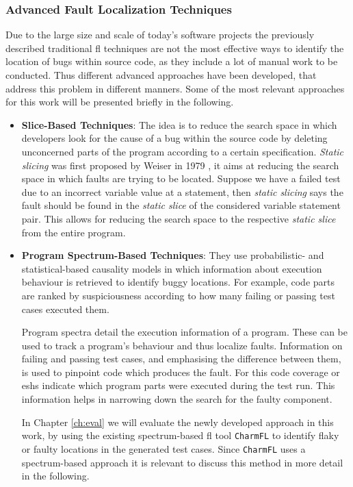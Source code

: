 \documentclass[
fancyheadings, %
%
%
]{stsreprt}
\begin{document}
\subsubsection{Advanced Fault Localization Techniques}
Due to the large size and scale of today's software projects the previously described traditional \acrshort{fl} techniques are not the most effective ways to identify the location of bugs within source code, as they include a lot of manual work to be conducted. 
Thus different advanced approaches have been developed, that address this problem in different manners. 
Some of the most relevant approaches for this work will be presented briefly in the following.
\begin{itemize}
    \item \textbf{Slice-Based Techniques}: The idea is to reduce the search space in which developers look for the cause of a bug within the source code by deleting unconcerned parts of the program according to a certain specification. 
    \textit{Static slicing} was first proposed by Weiser in 1979 \cite{slicing:1984}, it aims at reducing the search space in which faults are trying to be located. 
    Suppose we have a failed test due to an incorrect variable value at a statement, then \textit{static slicing} says the fault should be found in the \textit{static slice} of the considered variable statement pair.
    This allows for reducing the search space to the respective \textit{static slice} from the entire program. 
    \item \textbf{Program Spectrum-Based Techniques}: They use probabilistic- and statistical-based causality models in which information about execution behaviour is retrieved to identify buggy locations. For example, code parts are ranked by suspiciousness according to how many failing or passing test cases executed them.\par
    Program spectra detail the execution information of a program. 
    These can be used to track a program's behaviour and thus localize faults. 
    Information on failing and passing test cases, and emphasising the difference between them, is used to pinpoint code which produces the fault.
    For this code coverage or \acrlong{eshs} indicate which program parts were executed during the test run. 
    This information helps in narrowing down the search for the faulty component. \par
    In Chapter \ref{ch:eval} we will evaluate the newly developed approach in this work, by using the existing spectrum-based \acrshort{fl} tool \texttt{CharmFL} to identify flaky or faulty locations in the generated test cases. Since \texttt{CharmFL} uses a spectrum-based approach it is relevant to discuss this method in more detail in the following. \par 

\end{itemize}
\end{document}
